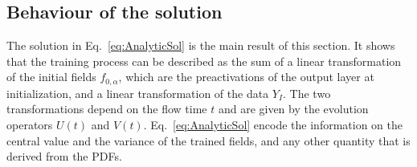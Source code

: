 
\subsection{Behaviour of the solution}
\label{sec:BehaviourOfSolution}
The solution in Eq.~\eqref{eq:AnalyticSol} is the main result of this section. It shows that the
training process can be described as the sum of a linear transformation of the initial fields $f_{0,\alpha}$,
which are the preactivations of the output layer at initialization, and a linear transformation
of the data $Y_I$. The two transformations depend on the flow time $t$ and are given by the evolution
operators $U(t)$ and $V(t)$. Eq.~\eqref{eq:AnalyticSol} encode the information on the central value
and the variance of the trained fields, and any other quantity that is derived from the PDFs. 

